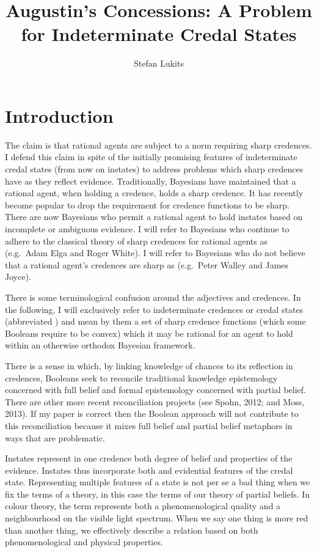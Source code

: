 \documentclass[11pt]{article}
\begin{document}
\title{Augustin's Concessions: A Problem for Indeterminate Credal States}
\author{Stefan Lukits}
\date{}
\maketitle
{}

\section{Introduction}
\label{Introduction}

The claim is that rational agents are subject to a norm requiring
sharp credences. I defend this claim in spite of the initially
promising features of indeterminate credal states (from now on
instates) to address problems which sharp credences have as they
reflect evidence. Traditionally, Bayesians have maintained that a
rational agent, when holding a credence, holds a sharp credence. It
has recently become popular to drop the requirement for credence
functions to be sharp. There are now Bayesians who permit a rational
agent to hold instates based on incomplete or ambiguous evidence. I
will refer to Bayesians who continue to adhere to the classical theory
of sharp credences for rational agents as  (e.g.\
Adam Elga and Roger White). I will refer to Bayesians who do not
believe that a rational agent's credences are sharp as
 (e.g.\ Peter Walley and James Joyce).

There is some terminological confusion around the adjectives
  and  credences.
In the following, I will exclusively refer to indeterminate credences
or credal states (abbreviated \qnull{instates}) and mean by them a set
of sharp credence functions (which some Booleans require to be convex)
which it may be rational for an agent to hold within an otherwise
orthodox Bayesian framework.\bcut{1}

There is a sense in which, by linking knowledge of chances to its
reflection in credences, Booleans seek to reconcile traditional
knowledge epistemology concerned with full belief and formal
epistemology concerned with partial belief. There are other more
recent reconciliation projects (see Spohn, 2012; and Moss, 2013). If
my paper is correct then the Boolean approach will not contribute to
this reconciliation because it mixes full belief and partial belief
metaphors in ways that are problematic.\fcut{2}\bcut{2}

Instates represent in one credence both degree of belief and
properties of the evidence. Instates thus incorporate both {\doxnotep}
and evidential features of the credal state. Representing multiple
features of a state is not per se a bad thing when we fix the terms of
a theory, in this case the terms of our theory of partial beliefs. In
colour theory, the term \qnull{red} represents both a phenomenological
quality and a neighbourhood on the visible light spectrum. When we say
one thing is more red than another thing, we effectively describe a
relation based on both phenomenological and physical properties.
\end{document}
